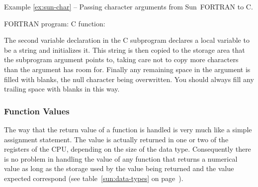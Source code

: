 \label{ex:sun-char}
\begin{center}
Example \ref{ex:sun-char} -- Passing character arguments from Sun~FORTRAN to C.
\end{center}
\nopagebreak[4]
FORTRAN program:
\pagebreak[1]
C function:

The second variable declaration in the C subprogram declares a local variable
to be a string and initializes it. This string is then copied to the storage
area that the subprogram argument points to, taking care not to copy more
characters than the argument has room for. Finally any remaining space in the
argument is filled with blanks, the null character being overwritten. You
should always fill any trailing space with blanks in this way. 

\subsubsection{Function Values}

The way that the return value of a function is handled is very much like a
simple assignment statement. The value is actually returned in one or two of
the registers of the CPU, depending on the size of the data type. Consequently
there is no problem in handling the value of any function that returns a
numerical value as long as the storage used by the value being returned and the
value expected correspond (see table~\ref{sun:data-types} on
page~\pageref{sun:data-types}). 

